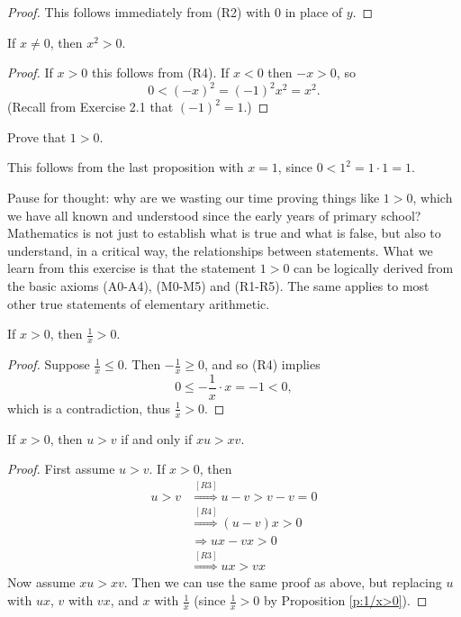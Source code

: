 \documentclass[11pt,dvipsnames]{book}
\numberwithin{figure}{section} %
\numberwithin{table}{section} %
\begin{document}
\begin{proof}
This follows immediately from (R2) with $0$ in place of $y$.
\end{proof}

\begin{proposition}
If $x\neq 0$, then $x^2>0$.
\end{proposition}

\begin{proof}
If $x>0$ this follows from (R4).  If $x<0$ then $-x>0$, so
\[
0<(-x)^2= (-1)^2x^2=x^2.
\]
(Recall from Exercise 2.1 that $(-1)^2=1$.)
\end{proof}

\begin{exercise}
Prove that $1>0$.
\begin{solution}
This follows from the last proposition with $x=1$, since $0<1^2=1\cdot 1=1$.
\end{solution}
\end{exercise}

Pause for thought: why are we wasting our time proving things like $1 > 0$, which we have all known and understood since the early years of primary school?
Mathematics is not just to establish what is true and what is false, but also to understand, in a critical way, the relationships between statements.
What we learn from this exercise is that the statement $1 > 0$ can be logically derived from the basic axioms (A0-A4), (M0-M5) and (R1-R5).
The same applies to most other true statements of elementary arithmetic.

\begin{proposition}
\label{p:1/x>0}
If $x>0$, then $\frac{1}{x}>0$.
\end{proposition}

\begin{proof}
Suppose $\frac{1}{x}\leq 0$. Then $-\frac{1}{x}\geq 0$, and so (R4) implies
\[
0\leq -\frac{1}{x}\cdot x = -1 < 0,\]
which is a contradiction, thus $\frac{1}{x}> 0$.
\end{proof}

\begin{proposition}
\label{p:xu>xv}
If $x>0$, then $u>v$ if and only if $xu>xv$.
\end{proposition}

\begin{proof}
First assume $u>v$. If $x>0$, then
\begin{align*}
u>v & \stackrel{[R3]}{\Longrightarrow} u-v>v-v=0\\
&  \stackrel{[R4]}{\Longrightarrow} (u-v)x>0\\
& \Longrightarrow ux-vx>0 \\
& \stackrel{[R3]}{\Longrightarrow} ux>vx
\end{align*}
Now assume $xu>xv$. Then we can use the same proof as above, but replacing $u$ with $ux$, $v$ with $vx$, and $x$ with $\frac{1}{x}$ (since $\frac{1}{x}>0$ by Proposition \ref{p:1/x>0}).
\end{proof}
\end{document}

